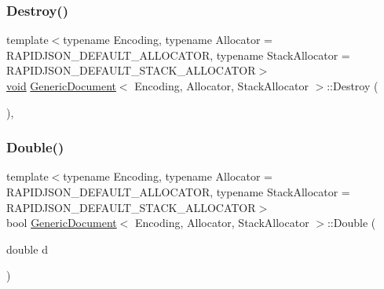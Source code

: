 \mbox{\label{classGenericDocument_ad72f36087f5129ad4b5321cf8418c923}} 
\subsubsection{\texorpdfstring{Destroy()}{Destroy()}}
{\footnotesize\ttfamily template$<$typename Encoding, typename Allocator = R\+A\+P\+I\+D\+J\+S\+O\+N\+\_\+\+D\+E\+F\+A\+U\+L\+T\+\_\+\+A\+L\+L\+O\+C\+A\+T\+OR, typename Stack\+Allocator = R\+A\+P\+I\+D\+J\+S\+O\+N\+\_\+\+D\+E\+F\+A\+U\+L\+T\+\_\+\+S\+T\+A\+C\+K\+\_\+\+A\+L\+L\+O\+C\+A\+T\+OR$>$ \\
\hyperlink{imgui__impl__opengl3__loader_8h_ac668e7cffd9e2e9cfee428b9b2f34fa7}{void} \hyperlink{classGenericDocument}{Generic\+Document}$<$ Encoding, Allocator, Stack\+Allocator $>$\+::Destroy (\begin{DoxyParamCaption}{ }\end{DoxyParamCaption})\hspace{0.3cm}{\ttfamily [inline]}, {\ttfamily [private]}}

\mbox{\label{classGenericDocument_a934bf7a5d1ff062ab079756d842e4f6b}} 
\subsubsection{\texorpdfstring{Double()}{Double()}}
{\footnotesize\ttfamily template$<$typename Encoding, typename Allocator = R\+A\+P\+I\+D\+J\+S\+O\+N\+\_\+\+D\+E\+F\+A\+U\+L\+T\+\_\+\+A\+L\+L\+O\+C\+A\+T\+OR, typename Stack\+Allocator = R\+A\+P\+I\+D\+J\+S\+O\+N\+\_\+\+D\+E\+F\+A\+U\+L\+T\+\_\+\+S\+T\+A\+C\+K\+\_\+\+A\+L\+L\+O\+C\+A\+T\+OR$>$ \\
bool \hyperlink{classGenericDocument}{Generic\+Document}$<$ Encoding, Allocator, Stack\+Allocator $>$\+::Double (\begin{DoxyParamCaption}\item[{double}]{d }\end{DoxyParamCaption})\hspace{0.3cm}{\ttfamily [inline]}}

\mbox{\label{classGenericDocument_a14097c833bed1a9c7be064ea619c887f}} 
